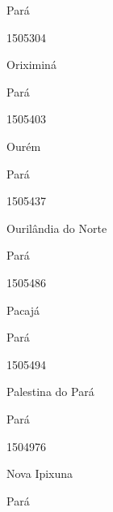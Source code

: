 \documentclass[
  letterpaper,
]{report}
\begin{document}
\n    

\n    

\n      

Pará

\n      

1505304

\n      

Oriximiná

\n    

\n    

\n      

Pará

\n      

1505403

\n      

Ourém

\n    

\n    

\n      

Pará

\n      

1505437

\n      

Ourilândia do Norte

\n    

\n    

\n      

Pará

\n      

1505486

\n      

Pacajá

\n    

\n    

\n      

Pará

\n      

1505494

\n      

Palestina do Pará

\n    

\n    

\n      

Pará

\n      

1504976

\n      

Nova Ipixuna

\n    

\n    

\n      

Pará

\n      
\end{document}
